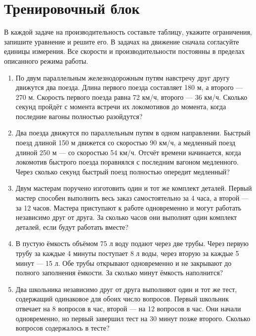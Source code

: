 \documentclass[a4paper,12pt]{article}
\newcommand{\example}[1]{\par\medskip{\color{darkaccent}\textbf{#1}}\par\smallskip}
\begin{document}
\section*{Тренировочный блок}
В каждой задаче на производительность составьте таблицу, укажите ограничения, запишите уравнение и решите его. В задачах на движение сначала согласуйте единицы измерения. Все скорости и производительности постоянны в пределах описанного режима работы.
\example{Базовый и средний уровень}
\begin{enumerate}
\item По двум параллельным железнодорожным путям навстречу друг другу движутся два поезда. Длина первого поезда составляет 180 м, а второго --- 270 м. Скорость первого поезда равна 72 км/ч, второго --- 36 км/ч. Сколько секунд пройдёт с момента встречи их локомотивов до момента, когда последние вагоны полностью разойдутся?
\item Два поезда движутся по параллельным путям в одном направлении. Быстрый поезд длиной 150 м движется со скоростью 90 км/ч, а медленный поезд длиной 250 м --- со скоростью 54 км/ч. Отсчёт времени начинается, когда локомотив быстрого поезда поравнялся с последним вагоном медленного. Через сколько секунд быстрый поезд полностью опередит медленный?
\item Двум мастерам поручено изготовить один и тот же комплект деталей. Первый мастер способен выполнить весь заказ самостоятельно за 4 часа, а второй --- за 12 часов. Мастера приступают к работе одновременно и могут работать независимо друг от друга. За сколько часов они выполнят один комплект деталей, если будут работать вместе?
\item В пустую ёмкость объёмом 75 л воду подают через две трубы. Через первую трубу за каждые 4 минуты поступает 8 л воды, через вторую за каждые 5 минут --- 15 л. Обе трубы открывают одновременно и не закрывают до полного заполнения ёмкости. За сколько минут ёмкость наполнится?
\item Два школьника независимо друг от друга выполняют один и тот же тест, содержащий одинаковое для обоих число вопросов. Первый школьник отвечает на 8 вопросов в час, второй --- на 12 вопросов в час. Они начали одновременно, но первый завершил тест на 30 минут позже второго. Сколько вопросов содержалось в тесте?
\end{enumerate}
\clearpage
\end{document}
